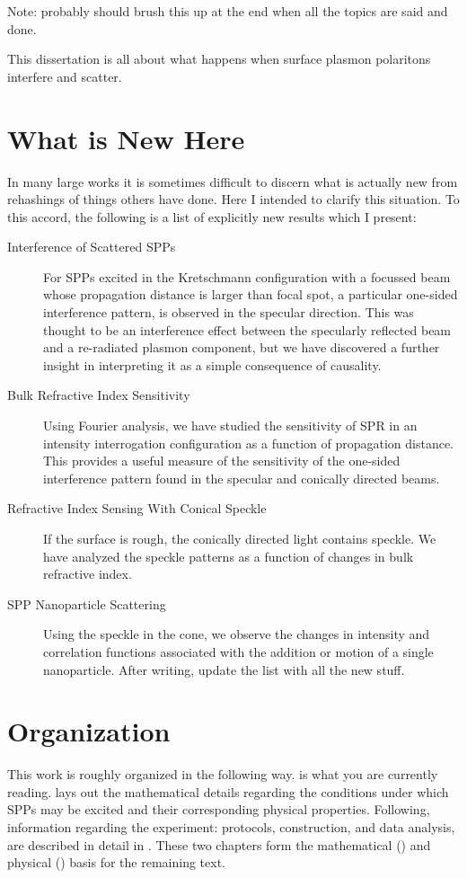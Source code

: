 Note: probably should brush this up at the end when all the topics are said
and done.

This dissertation is all about what happens when surface plasmon polaritons
interfere and scatter.

\section{What is New Here}
In many large works it is sometimes difficult to discern what is actually
new from rehashings of things others have done.  Here I intended to clarify
this situation.  To this accord, the following is a list of explicitly new
results which I present:

\begin{description}
\item[{Interference of Scattered SPPs}]
For SPPs excited in the Kretschmann configuration with a focussed beam
whose propagation distance is larger than focal spot, a particular one-sided
interference pattern, is observed in the specular direction.  This was
thought to be an interference effect between the specularly reflected beam
and a re-radiated plasmon component, but we have discovered a further
insight in interpreting it as a simple consequence of causality.
\item[{Bulk Refractive Index Sensitivity}] 
Using Fourier analysis, we have studied the sensitivity of SPR in an intensity
interrogation configuration as a function of propagation distance.  This
provides a useful measure of the sensitivity of the one-sided interference
pattern found in the specular and conically directed beams.
\item[{Refractive Index Sensing With Conical Speckle}]
If the surface is rough, the conically directed light contains speckle.  We
have analyzed the speckle patterns as a function of changes in bulk
refractive index.
\item[{SPP Nanoparticle Scattering}]
Using the speckle in the cone, we observe the changes in intensity and
correlation functions associated with the addition or motion of a single
nanoparticle.
After writing, update the list with all the new stuff.
\end{description}

\section{Organization}
This work is roughly organized in the following way.  
is what you are currently reading.   lays out the
mathematical details regarding the conditions under which SPPs may be
excited and their corresponding physical properties.  Following,
information regarding the experiment: protocols, construction, and data
analysis, are described in detail in .  These two
chapters form the mathematical () and physical
() basis for the remaining text.

